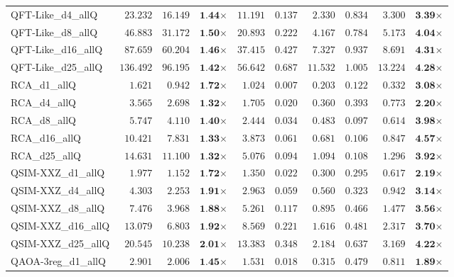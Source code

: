 \begin{table*}[t]
{\begin{tabular}{| l || r r c || r r r r r c |}
QFT-Like\_d4\_allQ & $23.232$ & $16.149$ & $\textbf{1.44}$$\times$ & $11.191$ & $0.137$ & $2.330$ & $0.834$ & $3.300$ & $\textbf{3.39}$$\times$ \\
QFT-Like\_d8\_allQ & $46.883$ & $31.172$ & $\textbf{1.50}$$\times$ & $20.893$ & $0.222$ & $4.167$ & $0.784$ & $5.173$ & $\textbf{4.04}$$\times$ \\
QFT-Like\_d16\_allQ & $87.659$ & $60.204$ & $\textbf{1.46}$$\times$ & $37.415$ & $0.427$ & $7.327$ & $0.937$ & $8.691$ & $\textbf{4.31}$$\times$ \\
QFT-Like\_d25\_allQ & $136.492$ & $96.195$ & $\textbf{1.42}$$\times$ & $56.642$ & $0.687$ & $11.532$ & $1.005$ & $13.224$ & $\textbf{4.28}$$\times$ \\
RCA\_d1\_allQ & $1.621$ & $0.942$ & $\textbf{1.72}$$\times$ & $1.024$ & $0.007$ & $0.203$ & $0.122$ & $0.332$ & $\textbf{3.08}$$\times$ \\
RCA\_d4\_allQ & $3.565$ & $2.698$ & $\textbf{1.32}$$\times$ & $1.705$ & $0.020$ & $0.360$ & $0.393$ & $0.773$ & $\textbf{2.20}$$\times$ \\
RCA\_d8\_allQ & $5.747$ & $4.110$ & $\textbf{1.40}$$\times$ & $2.444$ & $0.034$ & $0.483$ & $0.097$ & $0.614$ & $\textbf{3.98}$$\times$ \\
RCA\_d16\_allQ & $10.421$ & $7.831$ & $\textbf{1.33}$$\times$ & $3.873$ & $0.061$ & $0.681$ & $0.106$ & $0.847$ & $\textbf{4.57}$$\times$ \\
RCA\_d25\_allQ & $14.631$ & $11.100$ & $\textbf{1.32}$$\times$ & $5.076$ & $0.094$ & $1.094$ & $0.108$ & $1.296$ & $\textbf{3.92}$$\times$ \\
QSIM-XXZ\_d1\_allQ & $1.977$ & $1.152$ & $\textbf{1.72}$$\times$ & $1.350$ & $0.022$ & $0.300$ & $0.295$ & $0.617$ & $\textbf{2.19}$$\times$ \\
QSIM-XXZ\_d4\_allQ & $4.303$ & $2.253$ & $\textbf{1.91}$$\times$ & $2.963$ & $0.059$ & $0.560$ & $0.323$ & $0.942$ & $\textbf{3.14}$$\times$ \\
QSIM-XXZ\_d8\_allQ & $7.476$ & $3.968$ & $\textbf{1.88}$$\times$ & $5.261$ & $0.117$ & $0.895$ & $0.466$ & $1.477$ & $\textbf{3.56}$$\times$ \\
QSIM-XXZ\_d16\_allQ & $13.079$ & $6.803$ & $\textbf{1.92}$$\times$ & $8.569$ & $0.221$ & $1.616$ & $0.481$ & $2.317$ & $\textbf{3.70}$$\times$ \\
QSIM-XXZ\_d25\_allQ & $20.545$ & $10.238$ & $\textbf{2.01}$$\times$ & $13.383$ & $0.348$ & $2.184$ & $0.637$ & $3.169$ & $\textbf{4.22}$$\times$ \\
QAOA-3reg\_d1\_allQ & $2.901$ & $2.006$ & $\textbf{1.45}$$\times$ & $1.531$ & $0.018$ & $0.315$ & $0.479$ & $0.811$ & $\textbf{1.89}$$\times$ \\

\end{tabular}}
\end{table*}
